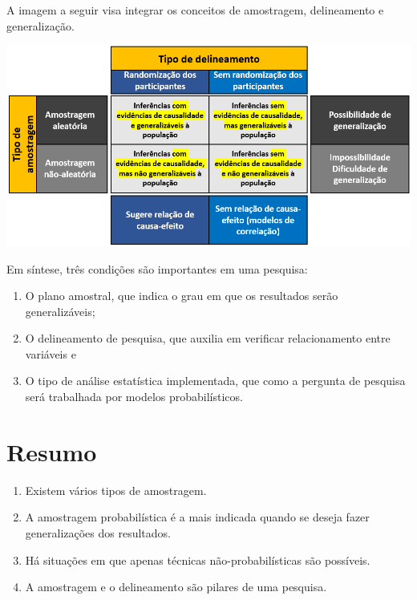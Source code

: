 \documentclass[
]{book}
\providecommand{\tightlist}{%
  \setlength{\itemsep}{0pt}\setlength{\parskip}{0pt}}
\newenvironment{explore}{
  \definecolor{shadecolor}{rgb}{0, 0, 0}  %
  \color{white}
  \begin{shaded}}
 {\end{shaded}}
\begin{document}
A imagem a seguir visa integrar os conceitos de amostragem, delineamento e generalização.

\includegraphics{./img/cap_amostra_delineamento.png}

Em síntese, três condições são importantes em uma pesquisa:

\begin{enumerate}
\def\labelenumi{(\arabic{enumi})}
\tightlist
\item
  O plano amostral, que indica o grau em que os resultados serão generalizáveis;
\item
  O delineamento de pesquisa, que auxilia em verificar relacionamento entre variáveis e\\
\item
  O tipo de análise estatística implementada, que como a pergunta de pesquisa será trabalhada por modelos probabilísticos.
\end{enumerate}

\hypertarget{resumo-4}{%
\section{Resumo}\label{resumo-4}}

\begin{explore}

\begin{enumerate}
\def\labelenumi{\arabic{enumi}.}
\tightlist
\item
  Existem vários tipos de amostragem.\\
\item
  A amostragem probabilística é a mais indicada quando se deseja fazer generalizações dos resultados.\\
\item
  Há situações em que apenas técnicas não-probabilísticas são possíveis.\\
\item
  A amostragem e o delineamento são pilares de uma pesquisa.\\
\end{enumerate}

\end{explore}
\end{document}
